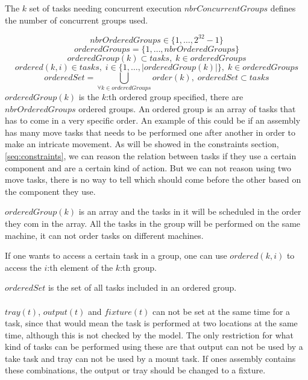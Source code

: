  The $k$ set of tasks needing concurrent execution
 $nbrConcurrentGroups$ defines the number of concurrent groups used. 
 
 \begin{equation}\label{eq:9}
 nbrOrderedGroups \in \{1 , \ldots , 2^{32}-1\}
 \end{equation}
 \begin{equation}\label{eq:9}
 orderedGroups = \{1 , \ldots , nbrOrderedGroups\}
 \end{equation}
 \begin{equation}\label{eq:18}
 orderedGroup(k) \subset tasks, \; k \in orderedGroups
 \end{equation}
 \begin{equation}\label{eq:32}
 ordered(k,i) \in tasks, \; i \in \{1 , \ldots , |orderedGroup(k)|\}, \; k \in orderedGroups
 \end{equation}
 \begin{equation}\label{eq:39}
 orderedSet = \bigcup_{\forall k \in orderedGroups}order(k), \; orderedSet \subset tasks
 \end{equation}
 $orderedGroup(k)$ is the $k$:th ordered group specified, there are $nbrOrderedGroups$ ordered groups. An ordered group is an array of tasks that has to come in a very specific order. An example of this could be if an assembly has many move tasks that needs to be performed one after another in order to make an intricate movement. As will be showed in the constraints section, \ref{seq:constraints}, we can reason the relation between tasks if they use a certain component and are a certain kind of action. But we can not reason using two move tasks, there is no way to tell which should come before the other based on the component they use. 
 
 $orderedGroup(k)$ is an array and the tasks in it will be scheduled in the order they com in the array. All the tasks in the group will be performed on the same machine, it can not order tasks on different machines.
 
 If one wants to access a certain task in a group, one can use $ordered(k,i)$ to access the $i$:th element of the $k$:th group.
 
 $orderedSet$ is the set of all tasks included in an ordered group.
 \\\\
 $tray(t)$, $output(t)$ and $fixture(t)$ can not be set at the same time for a task, since that would mean the task is performed at two locations at the same time, although this is not checked by the model. The only restriction for what kind of tasks can be performed using these are that output can not be used by a take task and tray can not be used by a mount task. If ones assembly contains these combinations, the output or tray should be changed to a fixture.
 
